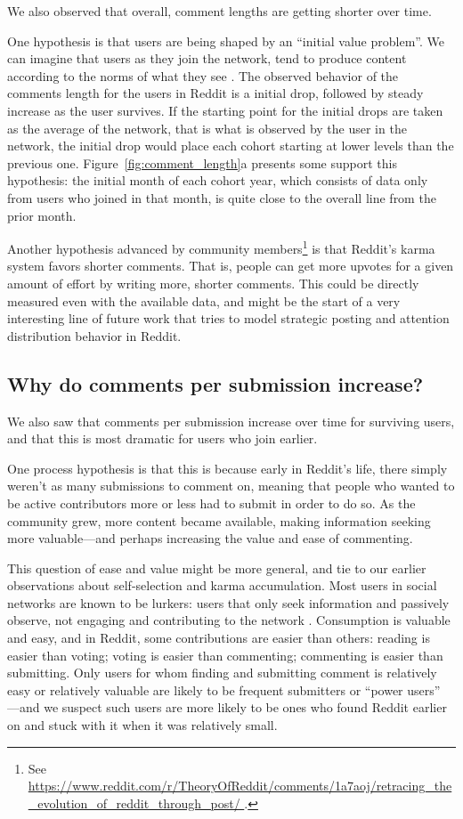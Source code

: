 We also observed that overall, comment lengths are getting shorter over time.  

One hypothesis is that users are being shaped by an ``initial value problem''. We can imagine that users as they join the network, tend to produce content according to the norms of what they see \cite{Kooti2010, Danescu-niculescu-mizil2013}.  The observed behavior of the comments length for the users in Reddit is a initial drop, followed by steady increase as the user survives. If the starting point for the initial drops are taken as the average of the network, that is what is observed by the user in the network, the initial drop would place each cohort starting at lower levels than the previous one.  Figure~\ref{fig:comment_length}a presents some support this hypothesis: the initial month of each cohort year, which consists of data only from users who joined in that month, is quite close to the overall line from the prior month.  

Another hypothesis advanced by community members\footnote{See \url{https://www.reddit.com/r/TheoryOfReddit/comments/1a7aoj/retracing_the_evolution_of_reddit_through_post/  }.} is that Reddit's karma system favors shorter comments.  That is, people can get more upvotes for a given amount of effort by writing more, shorter comments.  This could be directly measured even with the available data, and might be the start of a very interesting line of future work that tries to model strategic posting and attention distribution behavior in Reddit. 

\subsection{Why do comments per submission increase?}

We also saw that comments per submission increase over time for surviving users, and that this is most dramatic for users who join earlier.

One process hypothesis is that this is because early in Reddit's life, there simply weren't as many submissions to comment on, meaning that people who wanted to be active contributors more or less had to submit in order to do so. 
As the community grew, more content became available, making information seeking more valuable---and perhaps increasing the value and ease of commenting. 

This question of ease and value might be more general, and tie to our earlier observations about self-selection and karma accumulation.  Most users in social networks are known to be lurkers: users that only seek information and passively observe, not engaging and contributing to the network \cite{Rafaeli2004, Nonnecke2000}.  Consumption is valuable and easy, and in Reddit, some contributions are easier than others: reading is easier than voting; voting is easier than commenting; commenting is easier than submitting.  Only users for whom finding and submitting comment is relatively easy or relatively valuable are likely to be frequent submitters or ``power users'' \cite{Panciera2009, Kittur2007}---and we suspect such users are more likely to be ones who found Reddit earlier on and stuck with it when it was relatively small.

